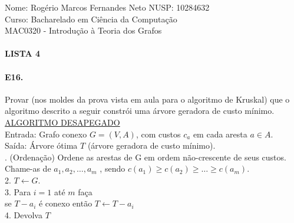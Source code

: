 \documentclass[11pt,a4paper,notitlepage]{exam}
\newcommand\Recebe{\leftarrow}
\begin{document}
\begin{center}
  Nome: Rogério Marcos Fernandes Neto\hphantom{xxx} NUSP: 10284632\\
  Curso: Bacharelado em Ciência da Computação\\
  MAC0320 - Introdução à Teoria dos Grafos
  \paragraph{}
  \textbf{LISTA 4}
\end{center}
\paragraph{E16.} Provar (nos moldes da prova vista em aula para o algoritmo de Kruskal) que o algoritmo
descrito a seguir constrói uma árvore geradora de custo mínimo.\\

\noindent
\underline{ALGORITMO DESAPEGADO}\\

\noindent
Entrada: Grafo conexo $G = (V, A)$, com custos $c_a$ em cada aresta $a \in A$.\\
Saída: Árvore ótima $T$ (árvore geradora de custo mínimo).\\

. (Ordenação) Ordene as arestas de G em ordem não-crescente de seus custos. Chame-as de \phantom{xxx}$a_1 , a_2 , \dots , a_m$ , sendo $c(a_1 ) \geq c(a_2 ) \geq \dots \geq c(a_m )$.\\
2. $T \Recebe G$.\\
3. Para $i = 1$ até $m$ faça\\
\hphantom{xxx}se $T - a_i$ é conexo então $T \Recebe T - a_i$\\
4. Devolva $T$
\end{document}
